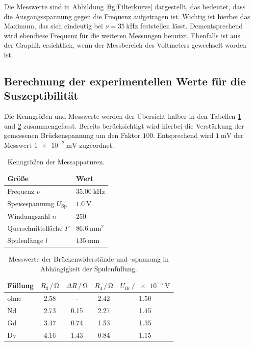     Die Messwerte sind in Abbildung \ref{fig:Filterkurve} dargestellt, das bedeutet, dass die Ausgangsspannung gegen die Frequenz aufgetragen ist. 
    Wichtig ist hierbei das Maximum, das sich eindeutig bei $\nu=\SI{35}{\kilo\hertz}$ feststellen lässt. 
    Dementsprechend wird ebendiese Frequenz für die weiteren Messungen benutzt. 
    Ebenfalls ist aus der Graphik ersichtlich, wenn der Messbereich des Voltmeters gewechselt worden ist. 

\subsection{Berechnung der experimentellen Werte für die Suszeptibilität}

    Die Kenngrößen und Messwerte werden der Übersicht halber in den Tabellen \ref{tab:KennGr} und \ref{tab:Messwerte} zusammengefasst.
    Bereits berücksichtigt wird hierbei die Verstärkung der gemessenen Brückenspannung um den Faktor $100$. Entsprechend 
    wird $\SI{1}{\milli\volt}$ der Messwert $\SI{1e-2}{\milli\volt}$ zugeordnet.
    \begin{table}
        \centering
        \caption{Kenngrößen der Messappaturen.}
        \label{tab:KennGr}
        \begin{tabular}{l l}
            \toprule
            Größe & Wert \\
            \midrule
            Frequenz $\nu$                  & $\SI{35.00}{\kilo\hertz}$ \\
            Speisespannung $U_\text{Sp}$    & $\SI{1.0}{\volt}$ \\
            Windungszahl $n$                & $\num{250}$ \\
            Querschnittsfläche $F$          & $\SI{86.6}{\milli\meter\squared}$ \\
            Spulenlänge $l$                 & $\SI{135}{\milli\meter}$ \\
            \bottomrule
        \end{tabular}
    \end{table}
    \begin{table}
        \centering
        \caption{Messwerte der Brückenwiderstände und -spannung in Abhängigkeit der Spulenfüllung.}
        \label{tab:Messwerte}
        \begin{tabular}{l c c c c}
            \toprule
            Füllung & $R_3\,/\,\si{\ohm}$ & $\Delta R\,/\,\si{\ohm}$ & $R_4\,/\,\si{\ohm}$ & $U_\text{Br}\,/\,\SI{e-5}{\volt}$ \\
            \midrule
            ohne    & 2.58 &  -   & 2.42 & 1.50 \\ 
            Nd      & 2.73 & 0.15 & 2.27 & 1.45 \\
            Gd      & 3.47 & 0.74 & 1.53 & 1.35 \\
            Dy      & 4.16 & 1.43 & 0.84 & 1.15 \\
            \bottomrule
        \end{tabular}
    \end{table}
    
